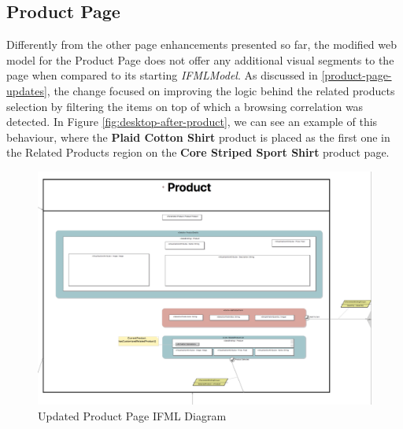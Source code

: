 \newpage
\subsection{Product Page}

Differently from the other page enhancements presented so far, the modified web model for the Product Page does not offer any additional visual segments to the page when compared to its starting \textit{IFMLModel}. As discussed in \ref{product-page-updates}, the change focused on improving the logic behind the related products selection by filtering the items on top of which a browsing correlation was detected. In Figure \ref{fig:desktop-after-product}, we can see an example of this behaviour, where the \textbf{Plaid Cotton Shirt} product is placed as the first one in the Related Products region on the \textbf{Core Striped Sport Shirt} product page.

\vspace{0.5cm}
\begin{figure}[H]
  \centering
    \includegraphics[width=14cm]{images/diagrams/after/ifml-product.png}
  \caption{Updated Product Page IFML Diagram}
  \label{fig:ifml-after-product}
\end{figure}

